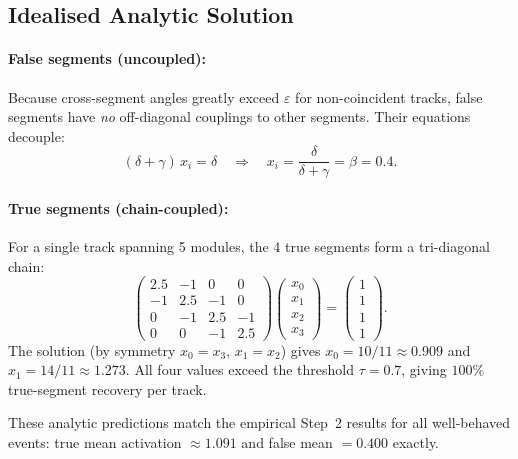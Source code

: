 \documentclass[12pt,a4paper]{article}
\newcommand{\eps}{\varepsilon}
\newcommand{\baseline}{\beta}  %
\newcommand{\thr}{\tau}        %
\begin{document}
\subsection{Idealised Analytic Solution}
\label{sec:analytic}

\paragraph{False segments (uncoupled):}
Because cross-segment angles greatly exceed $\eps$ for non-coincident tracks,
false segments have \emph{no} off-diagonal couplings to other segments.
Their equations decouple:
\begin{equation}
  (\delta + \gamma)\,x_i = \delta \quad \Rightarrow \quad
  x_i = \frac{\delta}{\delta+\gamma} = \baseline = 0.4.
  \label{eq:false_sol}
\end{equation}

\paragraph{True segments (chain-coupled):}
For a single track spanning 5 modules, the 4 true segments form a
tri-diagonal chain:
\begin{equation}
  \begin{pmatrix}
    2.5 & -1  & 0   & 0 \\
    -1  & 2.5 & -1  & 0 \\
    0   & -1  & 2.5 & -1 \\
    0   & 0   & -1  & 2.5
  \end{pmatrix}
  \begin{pmatrix} x_0 \\ x_1 \\ x_2 \\ x_3 \end{pmatrix}
  =
  \begin{pmatrix} 1 \\ 1 \\ 1 \\ 1 \end{pmatrix}.
  \label{eq:true_chain}
\end{equation}
The solution (by symmetry $x_0=x_3$, $x_1=x_2$) gives
$x_0 = 10/11 \approx 0.909$ and $x_1 = 14/11 \approx 1.273$.
All four values exceed the threshold $\thr=0.7$, giving $100\%$ true-segment
recovery per track.

These analytic predictions match the empirical Step~2 results for all
well-behaved events: true mean activation $\approx 1.091$ and false mean
$= 0.400$ exactly.
\end{document}
